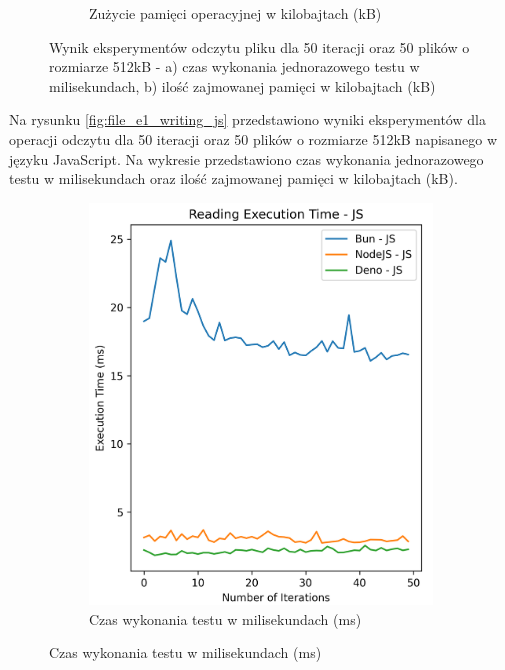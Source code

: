 \begin{figure}[H]
\begin{subfigure}[b]{0.4\textwidth}
    \caption{Zużycie pamięci operacyjnej w kilobajtach (kB)}
    \label{fig:file_e1_reading_js_memory}
  \end{subfigure}
  \caption{Wynik eksperymentów odczytu pliku dla 50 iteracji oraz 50 plików o rozmiarze 512kB - a) czas wykonania jednorazowego testu w milisekundach, b) ilość zajmowanej pamięci w kilobajtach (kB)}
  \label{fig:file_e1_reading_js}
\end{figure}

Na rysunku \ref{fig:file_e1_writing_js} przedstawiono wyniki eksperymentów dla operacji odczytu dla 50 iteracji oraz 50 plików o rozmiarze 512kB napisanego w języku JavaScript. Na wykresie przedstawiono czas wykonania jednorazowego testu w milisekundach oraz ilość zajmowanej pamięci w kilobajtach (kB).

\begin{figure}[H]
  \centering
  \begin{subfigure}[b]{0.4\textwidth}
    \centering
    \includegraphics[width=\textwidth]{Figures/files/files_writing_50_500_50_js_time.png}
    \caption{Czas wykonania testu w milisekundach (ms)}
    \label{fig:file_e1_writing_js_time}
  \end{subfigure}

\end{figure}
